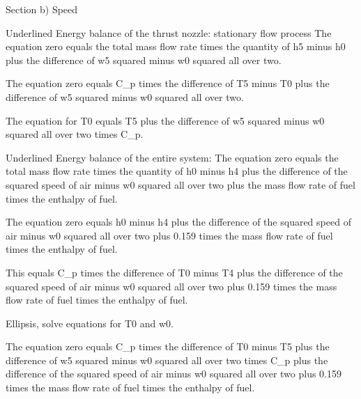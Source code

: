 Section b) Speed

Underlined Energy balance of the thrust nozzle: stationary flow process
The equation zero equals the total mass flow rate times the quantity of h5 minus h0 plus the difference of w5 squared minus w0 squared all over two.

The equation zero equals C_p times the difference of T5 minus T0 plus the difference of w5 squared minus w0 squared all over two.

The equation for T0 equals T5 plus the difference of w5 squared minus w0 squared all over two times C_p.

Underlined Energy balance of the entire system:
The equation zero equals the total mass flow rate times the quantity of h0 minus h4 plus the difference of the squared speed of air minus w0 squared all over two plus the mass flow rate of fuel times the enthalpy of fuel.

The equation zero equals h0 minus h4 plus the difference of the squared speed of air minus w0 squared all over two plus 0.159 times the mass flow rate of fuel times the enthalpy of fuel.

This equals C_p times the difference of T0 minus T4 plus the difference of the squared speed of air minus w0 squared all over two plus 0.159 times the mass flow rate of fuel times the enthalpy of fuel.

Ellipsis, solve equations for T0 and w0.

The equation zero equals C_p times the difference of T0 minus T5 plus the difference of w5 squared minus w0 squared all over two times C_p plus the difference of the squared speed of air minus w0 squared all over two plus 0.159 times the mass flow rate of fuel times the enthalpy of fuel.